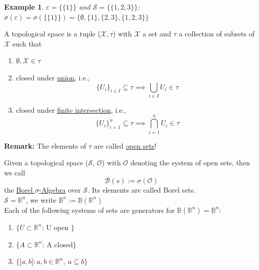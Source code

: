 \documentclass[10pt,a4paper]{article}
\theoremstyle{definition}
\theoremstyle{plain}
\newtheorem{example}{Example}[definition]
\begin{document}
\begin{example}
$\varepsilon = \big\{ \{1\} \big\}$ and $\mathcal{S} = \big\{ \{1, 2, 3\} \big\}$:\\
$\sigma(\varepsilon) = \sigma(\big\{ \{1\} \big\}) = \big\{\emptyset, \{1\}, \{2, 3\}, \{1, 2, 3\} \big\} $
\end{example}

\begin{boxeddef}
A topological space is a tuple ($\mathcal{X}, \tau$) with $\mathcal{X}$ a set and $\tau$ a collection of subsets of $\mathcal{X}$ such that
	\begin{enumerate}
		\item $\emptyset, \mathcal{X} \in \tau$
		\item closed under \underline{union}, i.e.,\\
		 $$ \big\{ U_i \big\}_{i \in I} \subseteq \tau \implies \bigcup_{i \in I} U_i \in \tau$$
		\item closed under \underline{finite intersection}, i.e., \\
			$$\big\{ U_i \big\}_{i = 1}^n \subseteq \tau \implies \bigcap_{i = 1}^{n} U_i \in \tau$$
	\end{enumerate}
\textbf{Remark:} The elements of $\tau$ are called \underline{open sets}!
\end{boxeddef}

\begin{boxeddef}
	Given a topological space ($\mathcal{S}$, $\mathcal{O}$) with $\mathcal{O}$ denoting the system of open sets, then we call
	$$\mathcal{B}(s) := \sigma(\mathcal{O})$$
	the \underline{Borel $\sigma$-Algebra} over $\mathcal{S}$. Its elements are called Borel sets.\\
	\newline
	$ \mathcal{S} = \mathbb{R}^n$, we write $\mathbb{B}^n := \mathbb{B}(\mathbb{R}^n)$\\
	
	Each of the following systems of sets are generators for $\mathbb{B}(\mathbb{R}^n) = \mathbb{B}^n$:
	\begin{enumerate}
		\item $\{U \subset \mathbb{R}^n$: U open $\}$
		\item $\{A \subset \mathbb{R}^n$: A closed$\}$
		\item $\big\{ ]a,b ] : a, b\in \mathbb{R}^n,\ a\subseteq b \big\} $
	\end{enumerate}
\end{boxeddef}
\end{document}
